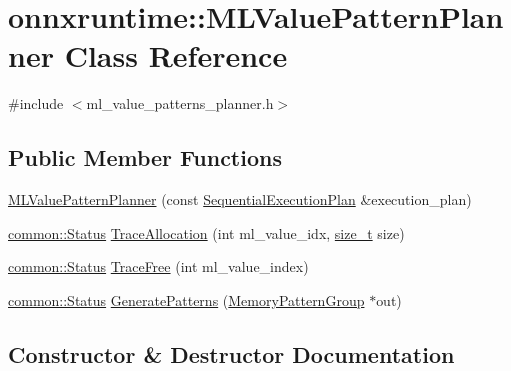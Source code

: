 \hypertarget{classonnxruntime_1_1MLValuePatternPlanner}{}\section{onnxruntime\+:\+:M\+L\+Value\+Pattern\+Planner Class Reference}
\label{classonnxruntime_1_1MLValuePatternPlanner}


{\ttfamily \#include $<$ml\+\_\+value\+\_\+patterns\+\_\+planner.\+h$>$}

\subsection*{Public Member Functions}
\begin{DoxyCompactItemize}
\item 
\mbox{\hyperlink{classonnxruntime_1_1MLValuePatternPlanner_a9c738e5c55937ceec949adfa09c13ae4}{M\+L\+Value\+Pattern\+Planner}} (const \mbox{\hyperlink{structonnxruntime_1_1SequentialExecutionPlan}{Sequential\+Execution\+Plan}} \&execution\+\_\+plan)
\item 
\mbox{\hyperlink{classonnxruntime_1_1common_1_1Status}{common\+::\+Status}} \mbox{\hyperlink{classonnxruntime_1_1MLValuePatternPlanner_a4a1c4b2462f7d42ea10db427c9ea669a}{Trace\+Allocation}} (int ml\+\_\+value\+\_\+idx, \mbox{\hyperlink{mlasi_8h_a503efbc1c6e50825320ad909366b78ab}{size\+\_\+t}} size)
\item 
\mbox{\hyperlink{classonnxruntime_1_1common_1_1Status}{common\+::\+Status}} \mbox{\hyperlink{classonnxruntime_1_1MLValuePatternPlanner_ac7ead95fa51ba48e2b1921363b29d235}{Trace\+Free}} (int ml\+\_\+value\+\_\+index)
\item 
\mbox{\hyperlink{classonnxruntime_1_1common_1_1Status}{common\+::\+Status}} \mbox{\hyperlink{classonnxruntime_1_1MLValuePatternPlanner_a0dc593c2ad38a00d42c8f9efebc354c2}{Generate\+Patterns}} (\mbox{\hyperlink{structonnxruntime_1_1MemoryPatternGroup}{Memory\+Pattern\+Group}} $\ast$out)
\end{DoxyCompactItemize}


\subsection{Constructor \& Destructor Documentation}
\mbox{\label{classonnxruntime_1_1MLValuePatternPlanner_a9c738e5c55937ceec949adfa09c13ae4}} 
